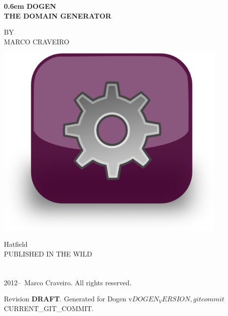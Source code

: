 \documentclass{book}
\begin{document}
\clearpage

\newcommand\nbvspace[1][3]{\vspace*{\stretch{#1}}}
\newcommand\nbstretchyspace{\spaceskip0.5em plus 0.25em minus 0.25em}
\newcommand{\nbtitlestretch}{\spaceskip0.6em}
\pagestyle{empty}
\begin{center}
\bfseries
\nbvspace[1]
\Huge
{\nbtitlestretch\huge
  DOGEN\\THE DOMAIN GENERATOR}

\nbvspace[1]
\normalsize

\nbvspace[1]
\small BY\\
\Large MARCO CRAVEIRO\\[0.5em]

\nbvspace[2]

\begin{center}
  \includegraphics[width=4.5in]{images/application_dogen}
\end{center}
\nbvspace[3]
\normalsize

Hatfield\\
\large
PUBLISHED IN THE WILD
\nbvspace[1]
\end{center}

%
%
\newpage
{}
\section*{}
\pagestyle{empty}
\vfill
\begingroup
\footnotesize
\parindent 0pt
\parskip \baselineskip

\textcopyright{} 2012--\the\year\ Marco Craveiro. All rights reserved.

Revision \textbf{DRAFT}. Generated for Dogen v${DOGEN_VERSION}, git
commit ${CURRENT_GIT_COMMIT}.
\end{document}
